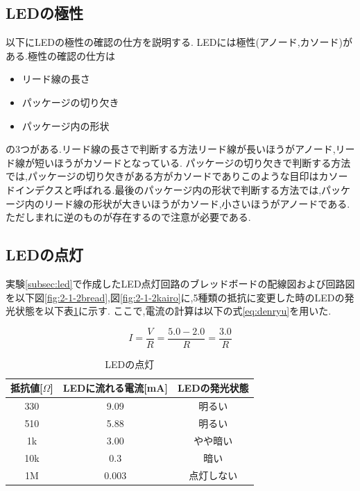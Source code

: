 \documentclass{jarticle}
\begin{document}
\subsection{LEDの極性}
以下にLEDの極性の確認の仕方を説明する.
LEDには極性(アノード,カソード)がある.極性の確認の仕方は

\begin{itemize}

\item リード線の長さ
\item パッケージの切り欠き
\item パッケージ内の形状

\end{itemize}

の3つがある.リード線の長さで判断する方法リード線が長いほうがアノード,リード線が短いほうがカソードとなっている.
パッケージの切り欠きで判断する方法では,パッケージの切り欠きがある方がカソードでありこのような目印はカソードインデクスと呼ばれる.最後のパッケージ内の形状で判断する方法では,パッケージ内のリード線の形状が大きいほうがカソード,小さいほうがアノードである.ただしまれに逆のものが存在するので注意が必要である.

\subsection{LEDの点灯}
実験\ref{subsec:led}で作成したLED点灯回路のブレッドボードの配線図および回路図を以下図\ref{fig:2-1-2bread},図\ref{fig:2-1-2kairo}に,5種類の抵抗に変更した時のLEDの発光状態を以下表\ref{table:led}に示す.
ここで,電流の計算は以下の式\ref{eq:denryu}を用いた.

\begin{equation}
I=\frac{V}{R}=\frac{5.0-2.0}{R}=\frac{3.0}{R}
\label{eq:denryu}
\end{equation}

\begin{table}[H]
\centering
\caption{LEDの点灯}
\label{table:led}
\begin{center}
\begin{tabular}{c|c|c}
\hline \hline
抵抗値[$\Omega$] &LEDに流れる電流[mA] &LEDの発光状態\\ \hline
330&9.09&明るい\\
510&5.88&明るい\\
1k&3.00&やや暗い\\
10k&0.3&暗い\\
1M&0.003&点灯しない\\ \hline
\end{tabular}
\end{center}
\end{table}
\end{document}
